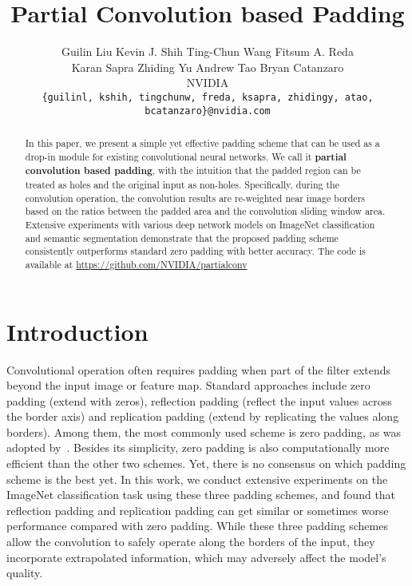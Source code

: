 \documentclass[10pt,twocolumn,letterpaper]{article}
\begin{document}
\title{Partial Convolution based Padding}

\author{Guilin Liu \quad Kevin J. Shih \quad Ting-Chun Wang \quad Fitsum A. Reda\\
Karan Sapra \quad Zhiding Yu \quad Andrew Tao \quad Bryan Catanzaro\\
NVIDIA\\
{\tt\small \{guilinl, kshih, tingchunw, freda, ksapra, zhidingy, atao, bcatanzaro\}@nvidia.com}}


\maketitle

\begin{abstract}
In this paper, we present a simple yet effective padding scheme that can be used as a drop-in module for existing convolutional neural networks. We call it \textbf{partial convolution based padding}, with the intuition that the padded region can be treated as holes and the original input as non-holes. Specifically, during the convolution operation, the convolution results are re-weighted near image borders based on the ratios between the padded area and the convolution sliding window area. Extensive experiments with various deep network models on ImageNet classification and semantic segmentation demonstrate that the proposed padding scheme consistently outperforms standard zero padding with better accuracy. The code is available at \href{https://github.com/NVIDIA/partialconv}{https://github.com/NVIDIA/partialconv}
\end{abstract}

\section{Introduction}

Convolutional operation often requires padding when part of the filter extends beyond the input image or feature map. Standard approaches include zero padding (extend with zeros), reflection padding (reflect the input values across the border axis) and replication padding (extend by replicating the values along borders).
Among them, the most commonly used scheme is zero padding, as was adopted by~\cite{krizhevsky2012imagenet}. Besides its simplicity, zero padding is also computationally more efficient than the other two schemes. Yet, there is no consensus on which padding scheme is the best yet. In this work, we conduct extensive experiments on the ImageNet classification task using these three padding schemes, and found that reflection padding and replication padding can get similar or sometimes worse performance compared with zero padding. While these three padding schemes allow the convolution to safely operate along the borders of the input, they incorporate extrapolated information, which may adversely affect the model's quality. 
\end{document}

